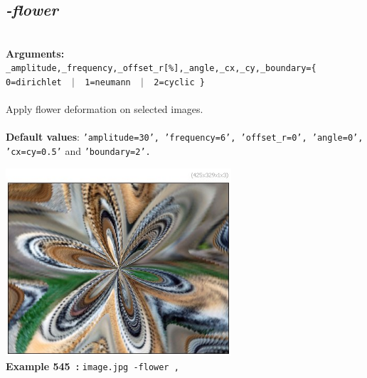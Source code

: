\documentclass[a4paper,11pt,twoside]{book}
\begin{document}
\subsection{\emph{-flower} }\vspace*{-0.5em}
~\\\textbf{Arguments: } 
{\small \texttt{\_amplitude,\_frequency,\_offset\_r[\%],\_angle,\_cx,\_cy,\_boundary=\{ 0=dirichlet ~$|$~ 1=neumann ~$|$~ 2=cyclic \}}}\\~\\
Apply flower deformation on selected images.
~\\~\\\textbf{Default values}: {\small \texttt{'amplitude=30', 'frequency=6', 'offset\_r=0', 'angle=0', 'cx=cy=0.5'} and \texttt{'boundary=2'.}}
\begin{center}\includegraphics[keepaspectratio=true,height=7cm,width=\textwidth]{img/gmic_def545.jpg}\\
{\footnotesize \textbf{Example 545~:} \texttt{image.jpg -flower ,}}
\end{center}
\end{document}
